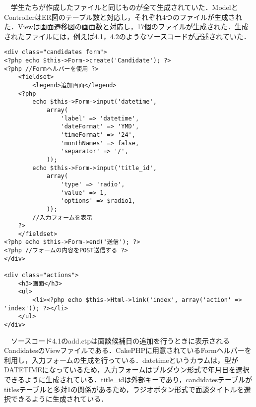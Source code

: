 \documentclass{funthesis}
\begin{document}
　学生たちが作成したファイルと同じものが全て生成されていた．ModelとControllerはER図のテーブル数と対応し，それぞれ4つのファイルが生成された．Viewは画面遷移図の画面数と対応し，17個のファイルが生成された．生成されたファイルには，例えば4.1，4.2のようなソースコードが記述されていた．\\
\begin{lstlisting}[caption=add.ctp,label=1]
<div class="candidates form">
<?php echo $this->Form->create('Candidate'); ?>
<?php //Formヘルパーを使用 ?>
	<fieldset>
		<legend>追加画面</legend>
	<?php
		echo $this->Form->input('datetime', 
			array(
				'label' => 'datetime',
				'dateFormat' => 'YMD',
				'timeFormat' => '24',
				'monthNames' => false,
				'separator' => '/',
			));
		echo $this->Form->input('title_id', 
			array(
				'type' => 'radio',
				'value' => 1,
				'options' => $radio1,
			));
		//入力フォームを表示
	?>
	</fieldset>
<?php echo $this->Form->end('送信'); ?>
<?php //フォームの内容をPOST送信する ?>
</div>

<div class="actions">
	<h3>画面</h3>
	<ul>
		<li><?php echo $this->Html->link('index', array('action' => 'index')); ?></li>
	</ul>
</div>

\end{lstlisting}
　ソースコード4.1のadd.ctpは面談候補日の追加を行うときに表示されるCandidatesのViewファイルである．CakePHPに用意されているFormヘルパーを利用し，入力フォームの生成を行っている．datetimeというカラムは，型がDATETIMEになっているため，入力フォームはプルダウン形式で年月日を選択できるように生成されている．title\_idは外部キーであり，candidatesテーブルがtitlesテーブルと多対1の関係があるため，ラジオボタン形式で面談タイトルを選択できるように生成されている．\\
\end{document}
